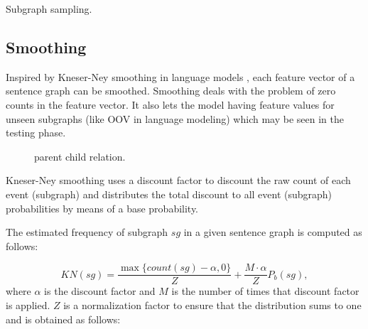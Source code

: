 \begin{algorithm}
    \begin{algorithmic}[1]
                \EndWhile
            \EndWhile
        \EndFunction
    \end{algorithmic}
    \caption{Subgraph sampling.}
    \label{alg:graph_sampling}
\end{algorithm}


\subsection{Smoothing} 
Inspired by Kneser-Ney smoothing in language models \cite{heafield13},
each feature vector of a sentence graph can be smoothed. Smoothing
deals with the problem of zero counts in the feature vector.  It also
lets the model having feature values for unseen subgraphs (like OOV in
language modeling) which may be seen in the testing phase.

\begin{figure*}[!t]
\centering
\small
\caption{parent child relation.} 
\label{f:parent_child_rel}
\end{figure*}

Kneser-Ney smoothing uses a discount factor to discount the raw count
of each event (subgraph) and distributes the total discount to all
event (subgraph) probabilities by means of a base probability.

The estimated frequency of subgraph $sg$ in a given sentence graph
is computed as follows:

\begin{equation*}
KN(sg) = \frac{\max \lbrace	 count(sg)-\alpha, 0 \rbrace }{Z} + \frac{M \cdot \alpha}{Z}P_b(sg),
\end{equation*}
%
where $\alpha$ is the discount factor and $M$ is the number of times
that discount factor is applied. $Z$ is a normalization factor
to ensure that the distribution sums to one and is obtained as follows:

